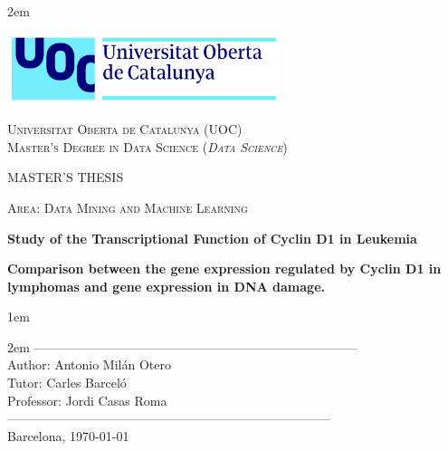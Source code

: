 \newpage
\thispagestyle{empty}

\baselineskip 2em


\centerline{\includegraphics[width=0.6\textwidth]{../images/UOC-logo}}
\begin{center}
\textsc{Universitat Oberta de Catalunya (UOC) \\
 Master's Degree in Data Science (\textit{Data Science})\\}


\vspace*{1.5cm}

\textsc{\Large MASTER'S THESIS}

\vspace*{0.5cm}

\textsc{\large Area: Data Mining and Machine Learning}



\vspace*{2.0cm}

\textbf{\Large Study of the Transcriptional Function of Cyclin D1 in Leukemia}

\textbf{\large Comparison between the gene expression regulated by Cyclin D1 in lymphomas and gene expression in DNA damage.}

\vspace{2.5cm}
\baselineskip 1em

\baselineskip 2em
-----------------------------------------------------------------------------\\
Author:     Antonio Milán Otero\\
Tutor:      Carles Barceló\\
Professor:  Jordi Casas Roma\\
-----------------------------------------------------------------------------\\
\vspace*{1.5cm}
Barcelona, \today

\end{center}

\newpage
\pagestyle{empty}
\hfill

